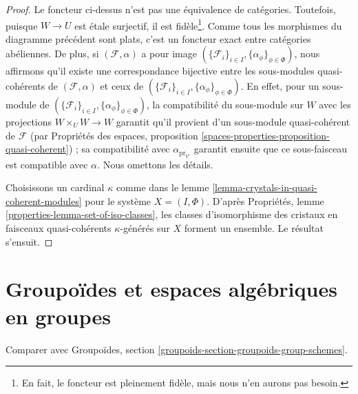 \begin{proof}
Le foncteur ci-dessus n'est pas une équivalence de catégories. Toutefois, puisque $W \to U$ est étale surjectif, il est fidèle\footnote{En fait, le foncteur est pleinement fidèle, mais nous n'en aurons pas besoin.}. Comme tous les morphismes du diagramme précédent sont plats, c'est un foncteur exact entre catégories abéliennes. De plus, si $(\mathcal{F}, \alpha)$ a pour image $(\{\mathcal{F}_i\}_{i \in I}, \{\alpha_\phi\}_{\phi \in \Phi})$, nous affirmons qu'il existe une correspondance bijective entre les sous-modules quasi-cohérents de $(\mathcal{F}, \alpha)$ et ceux de $(\{\mathcal{F}_i\}_{i \in I}, \{\alpha_\phi\}_{\phi \in \Phi})$. En effet, pour un sous-module de $(\{\mathcal{F}_i\}_{i \in I}, \{\alpha_\phi\}_{\phi \in \Phi})$, la compatibilité du sous-module sur $W$ avec les projections $W \times_U W \to W$ garantit qu'il provient d'un sous-module quasi-cohérent de $\mathcal{F}$ (par Propriétés des espaces, proposition \ref{spaces-properties-proposition-quasi-coherent}) ; sa compatibilité avec $\alpha_{\text{pr}_{V'}}$ garantit ensuite que ce sous-faisceau est compatible avec $\alpha$. Nous omettons les détails.

\medskip\noindent
Choisissons un cardinal $\kappa$ comme dans le lemme \ref{lemma-crystals-in-quasi-coherent-modules} pour le système $X = (I, \Phi)$. D'après Propriétés, lemme \ref{properties-lemma-set-of-iso-classes}, les classes d'isomorphisme des cristaux en faisceaux quasi-cohérents $\kappa$-générés sur $X$ forment un ensemble. Le résultat s'ensuit.
\end{proof}









\section{Groupoïdes et espaces algébriques en groupes}
\label{section-groupoids-group-spaces}

\noindent
Comparer avec Groupoïdes, section \ref{groupoids-section-groupoids-group-schemes}.

